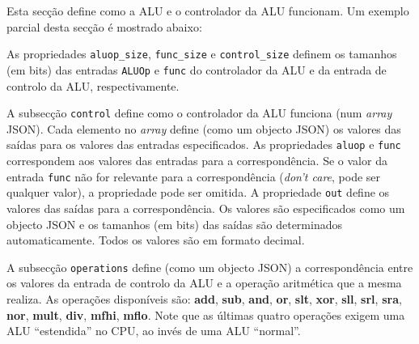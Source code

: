\documentclass[11pt,a4paper,twoside,titlepage]{report}
\begin{document}
Esta secção define como a ALU e o controlador da ALU funcionam.
Um exemplo parcial desta secção é mostrado abaixo:



As propriedades \verb+aluop_size+, \verb+func_size+ e \verb+control_size+
definem os tamanhos (em bits) das entradas \verb+ALUOp+ e \verb+func+ do
controlador da ALU e da entrada de controlo da ALU, respectivamente.

A subsecção \verb+control+ define como o controlador da ALU funciona (num
\emph{array} JSON).
Cada elemento no \emph{array} define (como um objecto JSON) os valores
das saídas para os valores das entradas especificados.
As propriedades \verb+aluop+ e \verb+func+ correspondem aos valores das
entradas para a correspondência. Se o valor da entrada \verb+func+ não for
relevante para a correspondência (\emph{don't care}, pode ser qualquer valor),
a propriedade pode ser omitida.
A propriedade \verb+out+ define os valores das saídas para a correspondência.
Os valores são especificados como um objecto JSON e os tamanhos (em bits) das
saídas são determinados automaticamente.
Todos os valores são em formato decimal.

A subsecção \verb+operations+ define (como um objecto JSON) a correspondência
entre os valores da entrada de controlo da ALU e a operação aritmética que a
mesma realiza.
As operações disponíveis são: \textbf{add}, \textbf{sub}, \textbf{and}, \textbf{or},
\textbf{slt}, \textbf{xor}, \textbf{sll}, \textbf{srl}, \textbf{sra}, \textbf{nor},
\textbf{mult}, \textbf{div}, \textbf{mfhi}, \textbf{mflo}.
Note que as últimas quatro operações exigem uma ALU ``estendida'' no CPU, ao
invés de uma ALU ``normal''.
\end{document}
